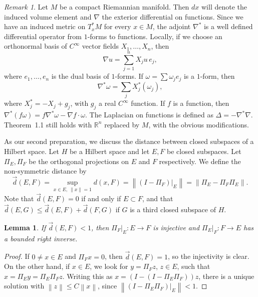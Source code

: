 \documentclass[11pt,a4paper]{article}
\newcommand{\R}{\mathbb R}
\newcommand{\norm}[1]{\left\lVert #1\right\rVert}
\newcommand{\dvec}{\overset{\rightarrow}{d}}
\numberwithin{equation}{section}
\newtheorem{lemma}[theorem]{Lemma}
\theoremstyle{remark}
\newtheorem{remark}[theorem]{Remark}
\begin{document}
\begin{remark}
Let $M$ be a compact Riemannian manifold. Then $dx$ will denote the induced volume element and $\nabla$ the exterior differential on functions. Since we have an induced metric on $T_x^*M$ for every $x\in M$, the adjoint $\nabla^*$ is a well defined differential operator from $1$-forms to functions. Locally, if we choose an orthonormal basis of $C^\infty$ vector fields $X_1,\ldots,X_n$, then
\[
\nabla u=\sum_{j=1}^n X_ju\,e_j,
\]
where $e_1,\ldots,e_n$ is the dual basis of $1$-forms. If $\omega=\sum\omega_je_j$ is a $1$-form, then
\[
\nabla^*\omega=\sum_jX_j^*(\omega_j),
\]
where $X_j^*=-X_j+g_j$, with $g_j$ a real $C^\infty$ function. If $f$ is a function, then $\nabla^*(f\omega)=f\nabla^*\omega-\nabla f\cdot\omega$. The Laplacian on functions is defined as $\Delta=-\nabla^*\nabla$. Theorem~1.1 still holds with $\R^n$ replaced by $M$, with the obvious modifications.
\end{remark}

As our second preparation, we discuss the distance between closed subspaces of a Hilbert space. Let $H$ be a Hilbert space and let $E,F$ be closed subspaces. Let $\Pi_E,\Pi_F$ be the orthogonal projections on $E$ and $F$ respectively. We define the non-symmetric distance by
\[
\dvec(E,F)=\sup_{x\in E,\ \norm{x}=1}d(x,F)
=\norm{(I-\Pi_F)|_E}=\norm{\Pi_E-\Pi_F\Pi_E}.
\]
Note that $\dvec(E,F)=0$ if and only if $E\subset F$, and that $\dvec(E,G)\le\dvec(E,F)+\dvec(F,G)$ if $G$ is a third closed subspace of $H$.

\begin{lemma}
If $\dvec(E,F)<1$, then $\Pi_F|_E:E\to F$ is injective and $\Pi_E|_F:F\to E$ has a bounded right inverse.
\end{lemma}
\begin{proof}
If $0\ne x\in E$ and $\Pi_Fx=0$, then $\dvec(E,F)=1$, so the injectivity is clear. On the other hand, if $x\in E$, we look for $y=\Pi_Fz$, $z\in E$, such that $x=\Pi_Ey=\Pi_E\Pi_Fz$. Writing this as $x=(I-(I-\Pi_E\Pi_F))z$, there is a unique solution with $\norm z\le C\norm x$, since $\norm{(I-\Pi_E\Pi_F)|_E}<1$.
\end{proof}
\end{document}
